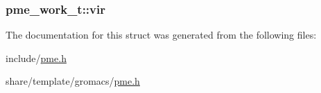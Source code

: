 \hypertarget{structpme__work__t_ae03dc273cd9e9596683ea6a8afe2945b}{
\subsubsection[{vir}]{ {\bf pme\-\_\-work\-\_\-t\-::vir}}}\label{structpme__work__t_ae03dc273cd9e9596683ea6a8afe2945b}


\-The documentation for this struct was generated from the following files\-:\begin{DoxyCompactItemize}
\item 
include/\hyperlink{include_2pme_8h}{pme.\-h}\item 
share/template/gromacs/\hyperlink{share_2template_2gromacs_2pme_8h}{pme.\-h}\end{DoxyCompactItemize}
